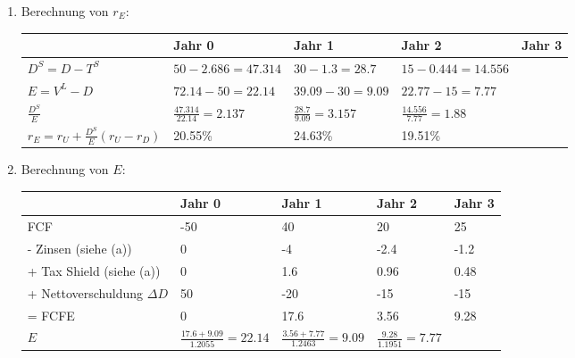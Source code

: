 \documentclass{article}
\begin{document}
\begin{enumerate}[label=(\alph*)]
		\item Berechnung von $r_E$:
		\begin{center}
			\begin{tabular}{l|l|l|l|l}
				& \textbf{Jahr 0} & \textbf{Jahr 1} & \textbf{Jahr 2} & \textbf{Jahr 3} \\
				\hline
				$D^S=D-T^S$ & $50-2.686=47.314$ & $30-1.3=28.7$ & $15-0.444=14.556$ & \\
				\hline
				$E=V^L-D$ & $72.14-50=22.14$ & $39.09-30=9.09$ & $22.77-15=7.77$ & \\
				\hline
				$\frac{D^S}{E}$ & $\frac{47.314}{22.14}=2.137$ & $\frac{28.7}{9.09}=3.157$ & $\frac{14.556}{7.77}=1.88$ & \\
				\hline
				$r_E=r_U + \frac{D^S}{E}(r_U-r_D)$ & 20.55\% & 24.63\% & 19.51\% &
			\end{tabular}
		\end{center}
		\item Berechnung von $E$:
		\begin{center}
			\begin{tabular}{l|l|l|l|l}
				& \textbf{Jahr 0} & \textbf{Jahr 1} & \textbf{Jahr 2} & \textbf{Jahr 3} \\
				\hline
				FCF & -50 & 40 & 20 & 25 \\
				\hline
				- Zinsen (siehe (a)) & 0 & -4 & -2.4 & -1.2 \\
				\hline
				+ Tax Shield (siehe (a)) & 0 & 1.6 & 0.96 & 0.48 \\
				\hline
				+ Nettoverschuldung $\Delta D$ & 50 & -20 & -15 & -15 \\
				\hline
				= FCFE & 0 & 17.6 & 3.56 & 9.28 \\
				\hline
				$E$ & $\frac{17.6+9.09}{1.2055}=22.14$ & $\frac{3.56+7.77}{1.2463}=9.09$ & $\frac{9.28}{1.1951}=7.77$ & 
			\end{tabular}
		\end{center}
	\end{enumerate}
\end{document}
